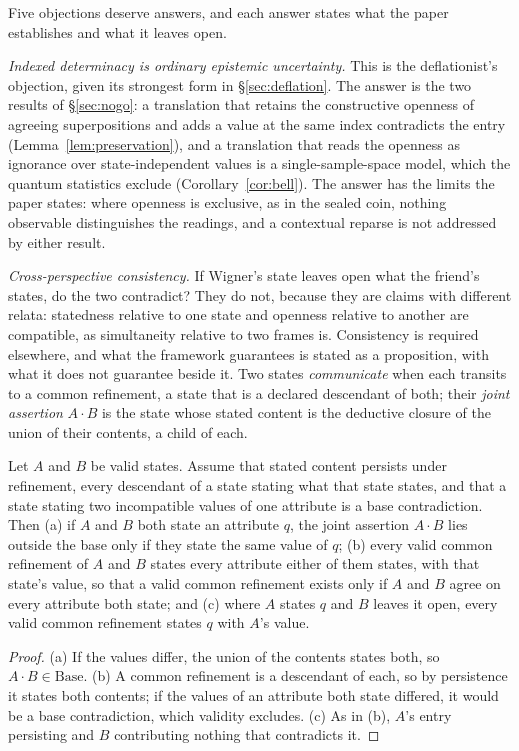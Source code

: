 \noindent Five objections deserve answers, and each answer states what the paper establishes and what it leaves open.

\textit{Indexed determinacy is ordinary epistemic uncertainty.} This is the deflationist's objection, given its strongest form in \S\ref{sec:deflation}. The answer is the two results of \S\ref{sec:nogo}: a translation that retains the constructive openness of agreeing superpositions and adds a value at the same index contradicts the entry (Lemma~\ref{lem:preservation}), and a translation that reads the openness as ignorance over state-independent values is a single-sample-space model, which the quantum statistics exclude (Corollary~\ref{cor:bell}). The answer has the limits the paper states: where openness is exclusive, as in the sealed coin, nothing observable distinguishes the readings, and a contextual reparse is not addressed by either result.

\textit{Cross-perspective consistency.} If Wigner's state leaves open what the friend's states, do the two contradict? They do not, because they are claims with different relata: statedness relative to one state and openness relative to another are compatible, as simultaneity relative to two frames is. Consistency is required elsewhere, and what the framework guarantees is stated as a proposition, with what it does not guarantee beside it. Two states \emph{communicate} when each transits to a common refinement, a state that is a declared descendant of both; their \emph{joint assertion} $A \cdot B$ is the state whose stated content is the deductive closure of the union of their contents, a child of each.

\begin{proposition}\label{prop:agreement}
Let $A$ and $B$ be valid states. Assume that stated content persists under refinement, every descendant of a state stating what that state states, and that a state stating two incompatible values of one attribute is a base contradiction. Then (a) if $A$ and $B$ both state an attribute $q$, the joint assertion $A \cdot B$ lies outside the base only if they state the same value of $q$; (b) every valid common refinement of $A$ and $B$ states every attribute either of them states, with that state's value, so that a valid common refinement exists only if $A$ and $B$ agree on every attribute both state; and (c) where $A$ states $q$ and $B$ leaves it open, every valid common refinement states $q$ with $A$'s value.
\end{proposition}
\begin{proof}
(a) If the values differ, the union of the contents states both, so $A \cdot B \in \mathrm{Base}$. (b) A common refinement is a descendant of each, so by persistence it states both contents; if the values of an attribute both state differed, it would be a base contradiction, which validity excludes. (c) As in (b), $A$'s entry persisting and $B$ contributing nothing that contradicts it.
\end{proof}

